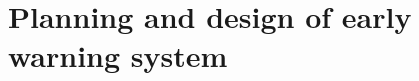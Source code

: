 \documentclass[fleqn,a4paper,12pt]{report}
\begin{document}






%
%
%
%
%
\tableofcontents
%
%

%

%

\chapter{ Planning and design of early warning system}


%
%



\begingroup
\raggedright


\endgroup
\end{document}
